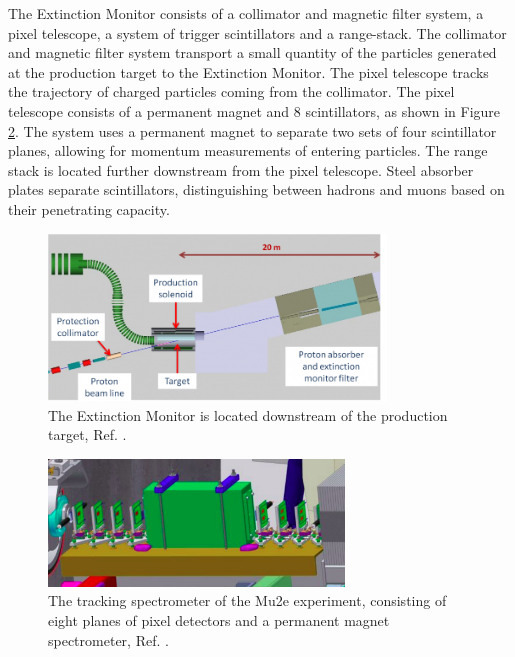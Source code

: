   The Extinction 
Monitor consists of a collimator and magnetic filter 
system, a pixel telescope, a system of trigger scintillators and a range-stack. The collimator and 
magnetic filter system transport a small quantity of 
the particles generated at the production target to the Extinction Monitor. The pixel telescope 
tracks the trajectory of charged particles coming from 
the collimator. The pixel telescope consists of a permanent magnet and 8 scintillators, as shown 
in Figure \ref{fig:extintionmonitor}. The system uses a 
permanent magnet to separate two sets of four scintillator planes, allowing for momentum measurements 
of entering particles. The range stack is located further 
downstream from the pixel telescope. Steel absorber plates separate scintillators, distinguishing 
between hadrons and muons based on their penetrating capacity.
\begin{figure}[!h]
\centering
\includegraphics[width =0.8\textwidth]{figures/png/800px-Extinction_filter.png}
\caption[The Extintion Monitor location.]{The Extinction Monitor is located downstream of the
production target, Ref. \cite{Prebys:IPAC2015-THPF121}.}
\label{fig:extintion}
\end{figure}
\begin{figure}[!h]
\centering
\includegraphics[width =0.7\textwidth]{figures/png/Screenshot_20240306_184720.png}
\caption[The Extintion Monitor.]{The tracking spectrometer of the Mu2e experiment, consisting of eight planes of pixel detectors and a permanent magnet spectrometer, Ref. \cite{Prebys:IPAC2015-THPF121}.}
\label{fig:extintionmonitor}
\end{figure}

